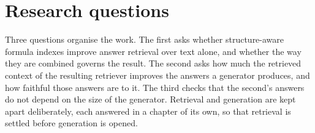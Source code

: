 %

\section{Research questions}\label{sec:intro-rqs}

Three questions organise the work. The first asks whether structure-aware formula indexes improve
answer retrieval over text alone, and whether the way they are combined governs the result. The
second asks how much the retrieved context of the resulting retriever improves the answers a
generator produces, and how faithful those answers are to it. The third checks that the second's
answers do not depend on the size of the generator. Retrieval and generation are kept apart
deliberately, each answered in a chapter of its own, so that retrieval is settled before generation
is opened.


